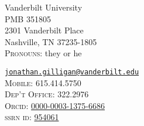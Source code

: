 \noindent
\parbox[t]{0.45\textwidth}{%
Vanderbilt University\\
PMB 351805\\
2301 Vanderbilt Place\\
Nashville, TN 37235-1805\\
\textsc{Pronouns:} they or he
}
\parbox[t]{0.5\textwidth}{\raggedleft
	{%
    \href{mailto:jonathan.gilligan@vanderbilt.edu}{\nolinkurl{jonathan.gilligan@vanderbilt.edu}}%
	}\\
    \textsc{Mobile:} 615.414.5750\\
    \textsc{Dep't Office:} 322.2976\\
    \textsc{Orcid:} \href{https://orcid.org/0000-0003-1375-6686}{0000-0003-1375-6686}\\
    \textsc{ssrn id:} \href{https://papers.ssrn.com/sol3/cf_dev/AbsByAuth.cfm?per_id=954061}{954061}\\
    \qquad{}
}
